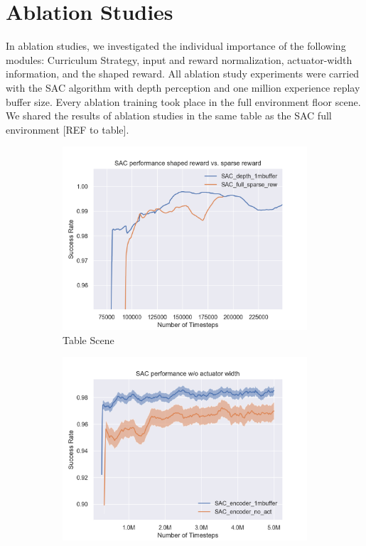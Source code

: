 \section{Ablation Studies}

In ablation studies, we investigated the individual importance of the following modules: Curriculum Strategy, input and reward normalization, actuator-width information, and the shaped reward. All ablation study experiments were carried with the SAC algorithm with depth perception and one million experience replay buffer size. Every ablation training took place in the full environment floor scene. We shared the results of ablation studies in the same table as the SAC full environment [REF to table].

\begin{figure}[htbp]
    \begin{subfigure}{0.49\textwidth}
        \includegraphics[width=\linewidth]{figures/ablation/SAC_performance_shaped_reward_vs_sparse_reward}
        \caption{Table Scene} \label{fig:table}
    \end{subfigure}%
    \hspace*{\fill}   %
    \begin{subfigure}{0.49\textwidth}
        \includegraphics[width=\linewidth]{figures/ablation/SAC_performance_wo_actuator_width}

\end{subfigure}
\end{figure}
